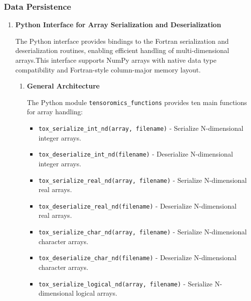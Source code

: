 \documentclass[11pt]{article}
\begin{document}
\subsubsection{Data Persistence}
\begin{enumerate}
	\item \textbf{Python Interface for Array Serialization and Deserialization}
	      
	      The Python interface provides bindings to the Fortran serialization and deserialization
	      routines, enabling efficient handling of multi-dimensional arrays.This
	      interface supports NumPy arrays with native data type compatibility and
	      Fortran-style column-major memory layout.
	      \begin{enumerate}
	      	\item \textbf{General Architecture}
	      	      
	      	      The Python module \texttt{tensoromics\_functions} provides ten main
	      	      functions for array handling:
	      	      
	      	      \begin{itemize}
	      	      	\item \texttt{tox\_serialize\_int\_nd(array, filename)} - Serialize
	      	      	      N-dimensional integer arrays.
	      	      	      
	      	      	\item \texttt{tox\_deserialize\_int\_nd(filename)} - Deserialize N-dimensional
	      	      	      integer arrays.
	      	      	      
	      	      	\item \texttt{tox\_serialize\_real\_nd(array, filename)} - Serialize
	      	      	      N-dimensional real arrays.
	      	      	      
	      	      	\item \texttt{tox\_deserialize\_real\_nd(filename)} - Deserialize N-dimensional
	      	      	      real arrays.
	      	      	      
	      	      	\item \texttt{tox\_serialize\_char\_nd(array, filename)} - Serialize
	      	      	      N-dimensional character arrays.
	      	      	      
	      	      	\item \texttt{tox\_deserialize\_char\_nd(filename)} - Deserialize N-dimensional
	      	      	      character arrays.
	      	      	      
	      	      	\item \texttt{tox\_serialize\_logical\_nd(array, filename)} -
	      	      	      Serialize N-dimensional logical arrays.
	      	      	      

\end{itemize}
\end{enumerate}
\end{enumerate}
\end{document}
